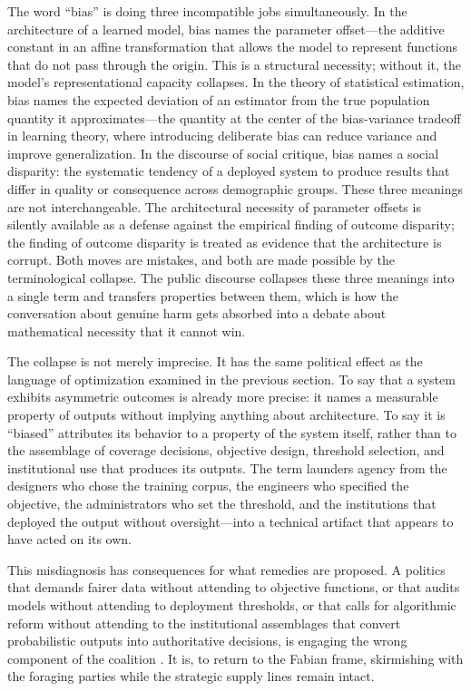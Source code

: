 \documentclass[12pt, a4paper]{article}
\begin{document}
The word \enquote{bias} is doing three incompatible jobs simultaneously. In the architecture of a learned model, bias names the parameter offset---the additive constant in an affine transformation that allows the model to represent functions that do not pass through the origin. This is a structural necessity; without it, the model's representational capacity collapses. In the theory of statistical estimation, bias names the expected deviation of an estimator from the true population quantity it approximates---the quantity at the center of the bias-variance tradeoff in learning theory, where introducing deliberate bias can reduce variance and improve generalization. In the discourse of social critique, bias names a social disparity: the systematic tendency of a deployed system to produce results that differ in quality or consequence across demographic groups. These three meanings are not interchangeable. The architectural necessity of parameter offsets is silently available as a defense against the empirical finding of outcome disparity; the finding of outcome disparity is treated as evidence that the architecture is corrupt. Both moves are mistakes, and both are made possible by the terminological collapse. The public discourse collapses these three meanings into a single term and transfers properties between them, which is how the conversation about genuine harm gets absorbed into a debate about mathematical necessity that it cannot win.

The collapse is not merely imprecise. It has the same political effect as the language of optimization examined in the previous section. To say that a system exhibits asymmetric outcomes is already more precise: it names a measurable property of outputs without implying anything about architecture. To say it is \enquote{biased} attributes its behavior to a property of the system itself, rather than to the assemblage of coverage decisions, objective design, threshold selection, and institutional use that produces its outputs. The term launders agency from the designers who chose the training corpus, the engineers who specified the objective, the administrators who set the threshold, and the institutions that deployed the output without oversight---into a technical artifact that appears to have acted on its own.

This misdiagnosis has consequences for what remedies are proposed. A politics that demands fairer data without attending to objective functions, or that audits models without attending to deployment thresholds, or that calls for algorithmic reform without attending to the institutional assemblages that convert probabilistic outputs into authoritative decisions, is engaging the wrong component of the coalition \citep{adalovace2021, raghavan2020}. It is, to return to the Fabian frame, skirmishing with the foraging parties while the strategic supply lines remain intact.
\end{document}
